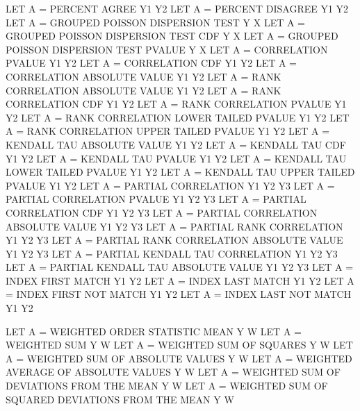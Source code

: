 {          LET A = PERCENT AGREE Y1 Y2
          LET A = PERCENT DISAGREE Y1 Y2
          LET A = GROUPED POISSON DISPERSION TEST        Y X
          LET A = GROUPED POISSON DISPERSION TEST CDF    Y X
          LET A = GROUPED POISSON DISPERSION TEST PVALUE Y X
          LET A = CORRELATION PVALUE Y1 Y2
          LET A = CORRELATION CDF Y1 Y2
          LET A = CORRELATION ABSOLUTE VALUE Y1 Y2
          LET A = RANK CORRELATION ABSOLUTE VALUE Y1 Y2
          LET A = RANK CORRELATION CDF Y1 Y2
          LET A = RANK CORRELATION PVALUE Y1 Y2
          LET A = RANK CORRELATION LOWER TAILED PVALUE Y1 Y2
          LET A = RANK CORRELATION UPPER TAILED PVALUE Y1 Y2
          LET A = KENDALL TAU ABSOLUTE VALUE Y1 Y2
          LET A = KENDALL TAU CDF Y1 Y2
          LET A = KENDALL TAU PVALUE Y1 Y2
          LET A = KENDALL TAU LOWER TAILED PVALUE Y1 Y2
          LET A = KENDALL TAU UPPER TAILED PVALUE Y1 Y2
          LET A = PARTIAL CORRELATION Y1 Y2 Y3
          LET A = PARTIAL CORRELATION PVALUE Y1 Y2 Y3
          LET A = PARTIAL CORRELATION CDF Y1 Y2 Y3
          LET A = PARTIAL CORRELATION ABSOLUTE VALUE Y1 Y2 Y3
          LET A = PARTIAL RANK CORRELATION Y1 Y2 Y3
          LET A = PARTIAL RANK CORRELATION ABSOLUTE VALUE Y1 Y2 Y3
          LET A = PARTIAL KENDALL TAU CORRELATION Y1 Y2 Y3
          LET A = PARTIAL KENDALL TAU ABSOLUTE VALUE Y1 Y2 Y3
          LET A = INDEX FIRST MATCH Y1 Y2
          LET A = INDEX LAST  MATCH Y1 Y2
          LET A = INDEX FIRST NOT MATCH Y1 Y2
          LET A = INDEX LAST  NOT MATCH Y1 Y2

          LET A = WEIGHTED ORDER STATISTIC MEAN  Y W
          LET A = WEIGHTED SUM   Y W
          LET A = WEIGHTED SUM OF SQUARES   Y W
          LET A = WEIGHTED SUM OF ABSOLUTE VALUES   Y W
          LET A = WEIGHTED AVERAGE OF ABSOLUTE VALUES   Y W
          LET A = WEIGHTED SUM OF DEVIATIONS FROM THE MEAN   Y W
          LET A = WEIGHTED SUM OF SQUARED DEVIATIONS FROM THE MEAN   Y W

}
